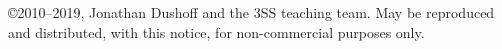 \copyright 2010--2019, Jonathan Dushoff and the 3SS teaching team.  May be reproduced and distributed, with this notice, for non-commercial purposes only.
